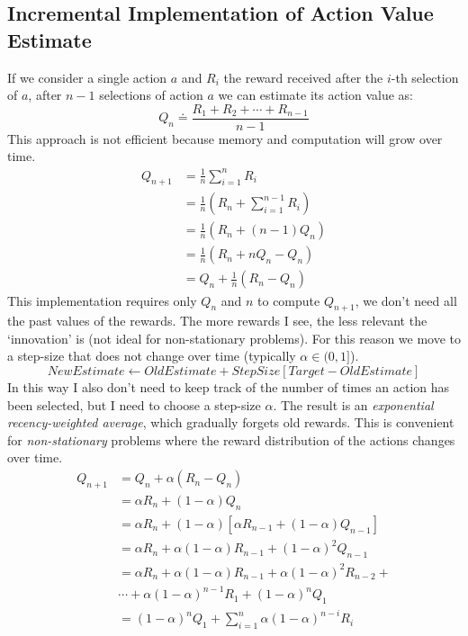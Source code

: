 \subsection{Incremental Implementation of Action Value Estimate}
If we consider a single action $a$ and $R_i$ the reward received after the $i$-th selection of $a$, after $n-1$ selections of action $a$ we can estimate its action value as:
\[Q_n\doteq\frac{R_1+R_2+\cdots{}+R_{n-1}}{n-1}\]
This approach is not efficient because memory and computation will grow over time.
\begin{equation}
\begin{split}
  Q_{n+1}&=\frac{1}{n}\sum_{i=1}^{n}R_i \\
  &=\frac{1}{n}\left(R_n+\sum_{i=1}^{n-1}R_i\right) \\
  &=\frac{1}{n}\left(R_n+(n-1)Q_n\right) \\
  &=\frac{1}{n}\left(R_n+nQ_n-Q_n\right) \\
  &=Q_n+\frac{1}{n}\left(R_n-Q_n\right)
\end{split}
\end{equation}
This implementation requires only $Q_n$ and $n$ to compute $Q_{n+1}$, we don't need all the past values of the rewards.
The more rewards I see, the less relevant the `innovation' is (not ideal for non-stationary problems).
For this reason we move to a step-size that does not change over time (typically $\alpha\in(0,1]$).
\[\textit{NewEstimate}\leftarrow\textit{OldEstimate}+\textit{StepSize}\left[\textit{Target}-\textit{OldEstimate}\right]\]
In this way I also don't need to keep track of the number of times an action has been selected, but I need to choose a step-size $\alpha$. The result is an \textit{exponential recency-weighted average}, which gradually forgets old rewards. This is convenient for \textit{non-stationary} problems where the reward distribution of the actions changes over time.
\begin{equation}
\begin{split}
  Q_{n+1}&=Q_n+\alpha\left(R_n-Q_n\right) \\
  &=\alpha R_n+(1-\alpha)Q_n \\
  &=\alpha R_n+(1-\alpha)\left[\alpha R_{n-1}+(1-\alpha)Q_{n-1}\right] \\
  &=\alpha R_n+\alpha(1-\alpha)R_{n-1}+(1-\alpha)^2Q_{n-1} \\
  &=\alpha R_n+\alpha(1-\alpha)R_{n-1}+\alpha(1-\alpha)^2R_{n-2}+ \\ &\cdots{}+\alpha(1-\alpha)^{n-1}R_1+(1-\alpha)^nQ_1 \\
  &=(1-\alpha)^nQ_1+\sum_{i=1}^{n}\alpha(1-\alpha)^{n-i}R_i
\end{split}
\end{equation}
